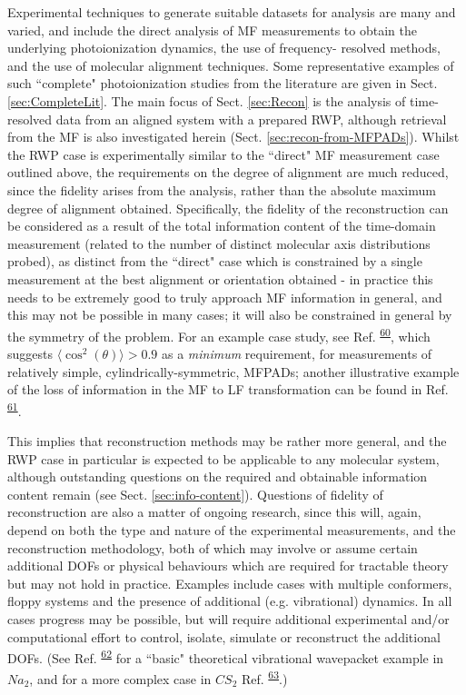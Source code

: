 \documentclass[10pt]{article}
\begin{document}
Experimental techniques to generate suitable datasets for analysis are many and varied, and include the direct analysis of MF measurements to obtain the underlying photoionization dynamics, the use of frequency- resolved methods, and the use of molecular alignment techniques. Some representative examples of such ``complete" photoionization studies from the literature are given in Sect. \ref{sec:CompleteLit}. %
The main focus of Sect. \ref{sec:Recon} is the analysis of time-resolved data from an aligned system with a prepared RWP, although retrieval from the MF is also investigated herein (Sect. \ref{sec:recon-from-MFPADs}). Whilst the RWP case is experimentally similar to the ``direct" MF measurement case outlined above, the requirements on the degree of alignment are much reduced, since the fidelity arises from the analysis, rather than the absolute maximum degree of alignment obtained. Specifically, the fidelity of the reconstruction can be considered as a result of the total information content of the time-domain measurement (related to the number of distinct molecular axis distributions probed), as distinct from the ``direct" case which is constrained by a single measurement at the best alignment or orientation obtained - in practice this needs to be extremely good to truly approach MF information in general, and this may not be possible in many cases; it will also be constrained in general by the symmetry of the problem. For an example case study, see Ref. \textsuperscript{\hyperref[csl:60]{60}}, which suggests $\langle\cos^2(\theta)\rangle>0.9$ as a \textit{minimum} requirement, for measurements of relatively simple, cylindrically-symmetric, MFPADs; another illustrative example of the loss of information in the MF to LF transformation can be found in Ref. \textsuperscript{\hyperref[csl:61]{61}}.

This implies that reconstruction methods may be rather more general, and the RWP case in particular is expected to be applicable to any molecular system, although outstanding questions on the required and obtainable information content remain (see Sect. \ref{sec:info-content}). Questions of fidelity of reconstruction are also a matter of ongoing research, since this will, again, depend on both the type and nature of the experimental measurements, and the reconstruction methodology, both of which may involve or assume certain additional DOFs or physical behaviours which are required for tractable theory but may not hold in practice. Examples include cases with multiple conformers, floppy systems and the presence of additional (e.g. vibrational) dynamics. In all cases progress may be possible, but will require additional experimental and/or computational effort to control, isolate, simulate or reconstruct the additional DOFs. (See Ref. \textsuperscript{\hyperref[csl:62]{62}} for a ``basic" theoretical vibrational wavepacket example in $Na_2$, and for a more complex case in $CS_2$ Ref. \textsuperscript{\hyperref[csl:63]{63}}.)
\end{document}

